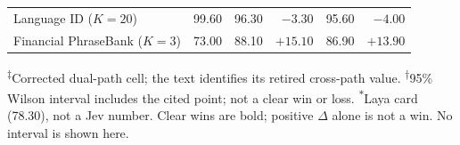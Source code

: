 \begin{table}[htbp]
\begin{tabular}{@{}lrrrrr@{}}
Language ID ($K=20$) & 99.60 & 96.30 & $-3.30$ & 95.60 & $-4.00$ \\
Financial PhraseBank ($K=3$) & 73.00 & 88.10 & \textbf{$+15.10$} & 86.90 & \textbf{$+13.90$} \\
\bottomrule
\end{tabular}
\par\smallskip
\footnotesize
\textsuperscript{\(\ddagger\)}Corrected dual-path cell; the text identifies
its retired cross-path value.
\quad
\textsuperscript{\(\dagger\)}95\% Wilson interval includes the cited point;
not a clear win or loss.
\quad
\textsuperscript{\(\ast\)}Laya card (78.30),
not a Jev number.
\quad
Clear wins are bold; positive $\Delta$ alone is not a win. No interval is shown
here.
\end{table}
